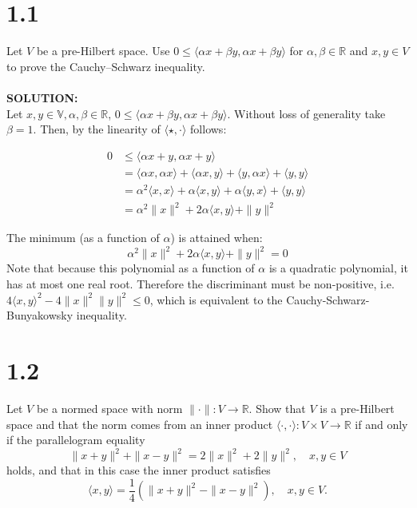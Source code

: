 \documentclass{article}
\begin{document}
\section*{1.1}
Let $V$ be a pre-Hilbert space. Use $0 \leq \langle \alpha x + \beta y, \alpha x + \beta y \rangle$ for $\alpha, \beta \in \mathbb{R}$ and $x, y \in V$ to prove the Cauchy–Schwarz inequality.
\\
\\
\noindent \textbf{SOLUTION: }\\

\noindent Let $x, y \in \mathbb{V}, \alpha, \beta \in \mathbb{R}$, $0 \leq \langle \alpha x + \beta y ,\alpha x + \beta y  \rangle$. Without loss of generality 
take $\beta = 1$. Then, by the linearity of $\langle \star, \cdot \rangle$ follows:

\begin{align*}
    0 &\leq \langle \alpha x + y, \alpha x + y\rangle \\
    &= \langle \alpha x, \alpha x \rangle + \langle \alpha x, y \rangle + \langle y, \alpha x \rangle + \langle y, y \rangle \\
    &= \alpha^2 \langle x, x \rangle + \alpha \langle x, y \rangle + \alpha \langle y, x \rangle + \langle y, y \rangle \\
    &= \alpha^2 \| x \|^2 + 2 \alpha \langle x, y \rangle + \| y \|^2
\end{align*}

\noindent The minimum (as a function of $\alpha$) is attained when:
\[ 
    \alpha^2 \| x \|^2 + 2 \alpha \langle x, y \rangle + \| y \|^2 = 0
\] Note that because this polynomial as a function of $\alpha$ is a quadratic polynomial, it has at most one real root. Therefore 
the discriminant must be non-positive, i.e. $4\langle x, y \rangle^2 - 4 \| x \|^2 \| y \|^2 \leq 0$, which is equivalent to
the Cauchy-Schwarz-Bunyakowsky inequality.

\section*{1.2}
Let $V$ be a normed space with norm $\| \cdot \| : V \to \mathbb{R}$. Show that $V$ is a pre-Hilbert space and that the norm comes from an inner product $\langle \cdot, \cdot \rangle : V \times V \to \mathbb{R}$ if and only if the parallelogram equality
\[
\|x + y\|^2 + \|x - y\|^2 = 2\|x\|^2 + 2\|y\|^2, \quad x, y \in V
\]
holds, and that in this case the inner product satisfies
\[
\langle x, y \rangle = \frac{1}{4} \left( \|x + y\|^2 - \|x - y\|^2 \right), \quad x, y \in V.
\]
\end{document}
